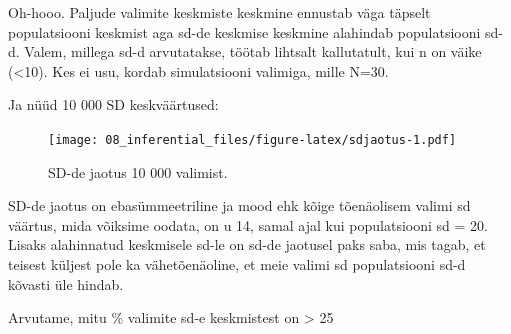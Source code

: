 \documentclass[]{book}
\newenvironment{Shaded}{\begin{snugshade}}{\end{snugshade}}
\newcommand{\KeywordTok}[1]{\textcolor[rgb]{0.13,0.29,0.53}{\textbf{#1}}}
\newcommand{\DataTypeTok}[1]{\textcolor[rgb]{0.13,0.29,0.53}{#1}}
\newcommand{\DecValTok}[1]{\textcolor[rgb]{0.00,0.00,0.81}{#1}}
\newcommand{\StringTok}[1]{\textcolor[rgb]{0.31,0.60,0.02}{#1}}
\newcommand{\CommentTok}[1]{\textcolor[rgb]{0.56,0.35,0.01}{\textit{#1}}}
\newcommand{\ControlFlowTok}[1]{\textcolor[rgb]{0.13,0.29,0.53}{\textbf{#1}}}
\newcommand{\OperatorTok}[1]{\textcolor[rgb]{0.81,0.36,0.00}{\textbf{#1}}}
\newcommand{\NormalTok}[1]{#1}
\begin{document}
Oh-hooo. Paljude valimite keskmiste keskmine ennustab väga täpselt
populatsiooni keskmist aga sd-de keskmise keskmine alahindab
populatsiooni sd-d. Valem, millega sd-d arvutatakse, töötab lihtsalt
kallutatult, kui n on väike (\textless{}10). Kes ei usu, kordab
simulatsiooni valimiga, mille N=30.

Ja nüüd 10 000 SD keskväärtused:



\begin{Shaded}
\end{Shaded}

\begin{figure}
\centering
\texttt{[image: 08\_inferential\_files/figure-latex/sdjaotus-1.pdf]}
\caption{\label{fig:sdjaotus}SD-de jaotus 10 000 valimist.}
\end{figure}

\begin{Shaded}
\end{Shaded}

SD-de jaotus on ebasümmeetriline ja mood ehk kõige tõenäolisem valimi sd
väärtus, mida võiksime oodata, on u 14, samal ajal kui populatsiooni sd
= 20. Lisaks alahinnatud keskmisele sd-le on sd-de jaotusel paks saba,
mis tagab, et teisest küljest pole ka vähetõenäoline, et meie valimi sd
populatsiooni sd-d kõvasti üle hindab.

Arvutame, mitu \% valimite sd-e keskmistest on \textgreater{} 25

\begin{Shaded}
\end{Shaded}
\end{document}
